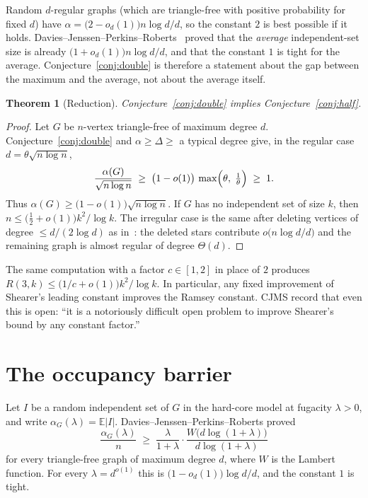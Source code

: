 \documentclass[11pt]{article}
\newtheorem{theorem}{Theorem}
\theoremstyle{definition}
\newcommand{\E}{\mathbb{E}}
\begin{document}
Random $d$-regular graphs (which are triangle-free with positive probability for
fixed $d$) have $\alpha=\bigl(2-o_d(1)\bigr)n\log d/d$, so the constant $2$ is
best possible if it holds. Davies--Jenssen--Perkins--Roberts~\cite{DJPR2018}
proved that the \emph{average} independent-set size is already
$\bigl(1+o_d(1)\bigr)n\log d/d$, and that the constant $1$ is tight for the
average. Conjecture~\ref{conj:double} is therefore a statement about the gap
between the maximum and the average, not about the average itself.

\begin{theorem}[Reduction]\label{thm:reduction}
Conjecture~\ref{conj:double} implies Conjecture~\ref{conj:half}.
\end{theorem}

\begin{proof}
Let $G$ be $n$-vertex triangle-free of maximum degree $d$.
Conjecture~\ref{conj:double} and $\alpha\ge\Delta\ge$ a typical degree give,
in the regular case $d=\theta\sqrt{n\log n}$,
\[
  \frac{\alpha(G)}{\sqrt{n\log n}}
  \;\ge\;
  \bigl(1-o(1)\bigr)\,
  \max\Bigl(\theta,\;\tfrac{1}{\theta}\Bigr)
  \;\ge\;
  1.
\]
Thus $\alpha(G)\ge\bigl(1-o(1)\bigr)\sqrt{n\log n}$.
If $G$ has no independent set of size $k$, then $n\le\bigl(\tfrac12+o(1)\bigr)k^{2}/\log k$.
The irregular case is the same after deleting vertices of degree
$\le d/(2\log d)$ as in~\cite[Lemma~1]{DJPR2018}: the deleted stars contribute
$o\bigl(n\log d/d\bigr)$ and the remaining graph is almost regular of degree
$\Theta(d)$.
\end{proof}

The same computation with a factor $c\in[1,2]$ in place of $2$ produces
$R(3,k)\le\bigl(1/c+o(1)\bigr)k^{2}/\log k$.
In particular, any fixed improvement of Shearer's leading constant improves the
Ramsey constant. CJMS record that even this is open:
``it is a notoriously difficult open problem to improve Shearer's bound by any
constant factor.''

\section{The occupancy barrier}

Let $I$ be a random independent set of $G$ in the hard-core model at fugacity
$\lambda>0$, and write $\alpha_G(\lambda)=\E|I|$.
Davies--Jenssen--Perkins--Roberts proved
\begin{equation}\label{eq:occup}
  \frac{\alpha_G(\lambda)}{n}
  \;\ge\;
  \frac{\lambda}{1+\lambda}
  \cdot
  \frac{W\bigl(d\log(1+\lambda)\bigr)}{d\log(1+\lambda)}
\end{equation}
for every triangle-free graph of maximum degree $d$, where $W$ is the Lambert
function. For every $\lambda=d^{o(1)}$ this is
$\bigl(1-o_d(1)\bigr)\log d/d$, and the constant $1$ is tight.
\end{document}
